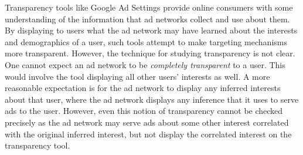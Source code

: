 \documentclass[10pt, onecolumn]{report}
\begin{document}
Transparency tools like Google Ad Settings provide online consumers 
with some understanding of the information that ad networks collect 
and use about them. By displaying to users what the ad network may 
have learned about the interests and demographics of a user, such tools 
attempt to make targeting mechanisms more transparent. 
However, the technique for studying transparency is not clear. 
One cannot expect an ad network to be \emph{completely transparent} to a user. 
This would involve the tool displaying all other users' interests as well. 
A more reasonable expectation is for the ad network to display any inferred 
interests about that user, where the ad network displays any inference
that it uses to serve ads to the user. 
However, even this notion of transparency cannot be checked precisely as 
the ad network may serve ads about some other interest correlated 
with the original inferred interest, but not display the correlated 
interest on the transparency tool. %
\end{document}
